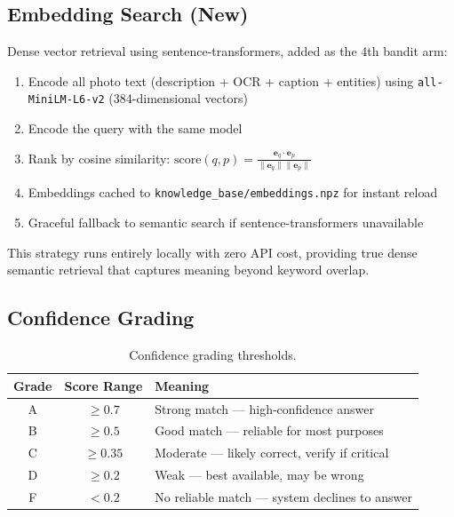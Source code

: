 \documentclass[11pt,letterpaper]{article}
\begin{document}
\subsection{Embedding Search (New)}

Dense vector retrieval using sentence-transformers, added as the 4th bandit arm:
\begin{enumerate}[nosep]
  \item Encode all photo text (description + OCR + caption + entities) using \texttt{all-MiniLM-L6-v2} (384-dimensional vectors)
  \item Encode the query with the same model
  \item Rank by cosine similarity: $\text{score}(q, p) = \frac{\mathbf{e}_q \cdot \mathbf{e}_p}{\|\mathbf{e}_q\| \|\mathbf{e}_p\|}$
  \item Embeddings cached to \texttt{knowledge\_base/embeddings.npz} for instant reload
  \item Graceful fallback to semantic search if sentence-transformers unavailable
\end{enumerate}

This strategy runs entirely locally with zero API cost, providing true dense semantic retrieval that captures meaning beyond keyword overlap.

\subsection{Confidence Grading}

\begin{table}[H]
\centering
\begin{tabular}{ccp{8cm}}
\toprule
\textbf{Grade} & \textbf{Score Range} & \textbf{Meaning} \\
\midrule
A & $\geq 0.7$ & Strong match --- high-confidence answer \\
B & $\geq 0.5$ & Good match --- reliable for most purposes \\
C & $\geq 0.35$ & Moderate --- likely correct, verify if critical \\
D & $\geq 0.2$ & Weak --- best available, may be wrong \\
F & $< 0.2$ & No reliable match --- system declines to answer \\
\bottomrule
\end{tabular}
\caption{Confidence grading thresholds.}
\label{tab:confidence-grades}
\end{table}
\end{document}
